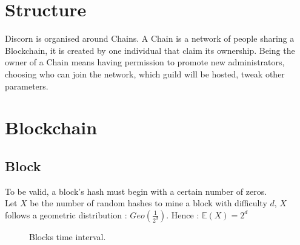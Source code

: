 \documentclass[a4paper,10pt]{article}
\begin{document}
    \section{Structure}
        Discorn is organised around Chains. A Chain is a network of people sharing a Blockchain, it is created by one individual that claim its ownership. Being the owner of a Chain means having permission to promote
        new administrators, choosing who can join the network, which guild will be hosted, tweak other parameters.
        

    \section{Blockchain}
    
        \subsection{Block}
            To be valid, a block's hash must begin with a certain number of zeros. \\
            Let $X$ be the number of random hashes to mine a block with difficulty $d$, $X$ follows a geometric distribution : $Geo(\frac{1}{2^d})$. Hence : $\mathbb{E}(X)= 2^d$\\
            \begin{figure}[h]\centering
                \caption{Blocks time interval.}\label{fig:Bti}
            \end{figure}\\
            
\end{document}
